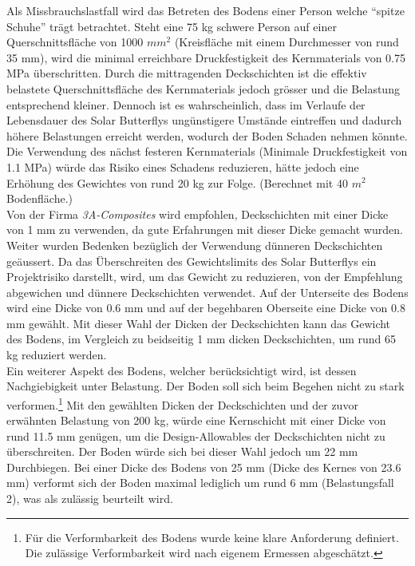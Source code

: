 Als Missbrauchslastfall wird das Betreten des Bodens einer Person welche ``spitze Schuhe'' trägt betrachtet. Steht eine 75 kg schwere Person auf einer Querschnittsfläche von 1000 $mm^2$ (Kreisfläche mit einem Durchmesser von rund 35 mm), wird die minimal erreichbare Druckfestigkeit des Kernmaterials von 0.75 MPa überschritten. Durch die mittragenden Deckschichten ist die effektiv belastete Querschnittsfläche des Kernmaterials jedoch grösser und die Belastung entsprechend kleiner. Dennoch ist es wahrscheinlich, dass im Verlaufe der Lebensdauer des Solar Butterflys ungünstigere Umstände eintreffen und dadurch höhere Belastungen erreicht werden, wodurch der Boden Schaden nehmen könnte. Die Verwendung des nächst festeren Kernmaterials (Minimale Druckfestigkeit von 1.1 MPa) würde das Risiko eines Schadens reduzieren, hätte jedoch eine Erhöhung des Gewichtes von rund 20 kg zur Folge. (Berechnet mit 40 $m^2$ Bodenfläche.)\\
Von der Firma \emph{3A-Composites} wird empfohlen, Deckschichten mit einer Dicke von 1 mm zu verwenden, da gute Erfahrungen mit dieser Dicke gemacht wurden. Weiter wurden Bedenken bezüglich der Verwendung dünneren Deckschichten geäussert. Da das Überschreiten des Gewichtslimits des Solar Butterflys ein Projektrisiko darstellt, wird, um das Gewicht zu reduzieren, von der Empfehlung abgewichen und dünnere Deckschichten verwendet. Auf der Unterseite des Bodens wird eine Dicke von 0.6 mm und auf der begehbaren Oberseite eine Dicke von 0.8 mm gewählt. Mit dieser Wahl der Dicken der Deckschichten kann das Gewicht des Bodens, im Vergleich zu beidseitig 1 mm dicken Deckschichten, um rund 65 kg reduziert werden.\\

Ein weiterer Aspekt des Bodens, welcher berücksichtigt wird, ist dessen Nachgiebigkeit unter Belastung. Der Boden soll sich beim Begehen nicht zu stark verformen.\footnote{Für die Verformbarkeit des Bodens wurde keine klare Anforderung definiert. Die zulässige Verformbarkeit wird nach eigenem Ermessen abgeschätzt.}  Mit den gewählten Dicken der Deckschichten und der zuvor erwähnten Belastung von 200 kg, würde eine Kernschicht mit einer Dicke von rund 11.5 mm genügen, um die Design-Allowables der Deckschichten nicht zu überschreiten. Der Boden würde sich bei dieser Wahl jedoch um 22 mm Durchbiegen. Bei einer Dicke des Bodens von 25 mm (Dicke des Kernes von 23.6 mm) verformt sich der Boden maximal lediglich um rund 6 mm (Belastungsfall 2), was als zulässig beurteilt wird.

